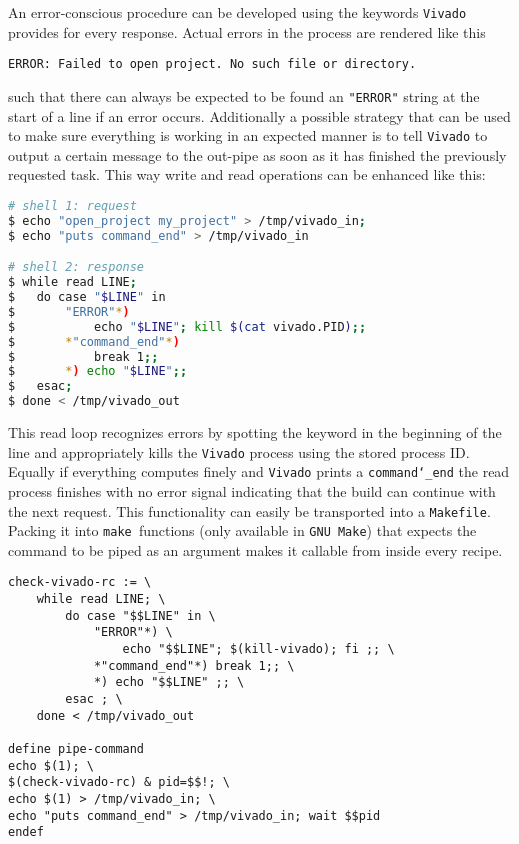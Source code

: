 An error-conscious procedure can be developed using the keywords \texttt{Vivado} provides for every response. Actual errors in the process are rendered like this
\begin{lstlisting}
ERROR: Failed to open project. No such file or directory.
\end{lstlisting}
\noindent
such that there can always be expected to be found an \texttt{"ERROR"} string at the start of a line if an error occurs. Additionally a possible strategy that can be used to make sure everything is working in an expected manner is to tell \texttt{Vivado} to output a certain message to the out-pipe as soon as it has finished the previously requested task. This way write and read operations can be enhanced like this:

\begin{lstlisting}[language=bash]
# shell 1: request
$ echo "open_project my_project" > /tmp/vivado_in;
$ echo "puts command_end" > /tmp/vivado_in

# shell 2: response
$ while read LINE;
$ 	do case "$LINE" in
$		"ERROR"*)
$			echo "$LINE"; kill $(cat vivado.PID);;
$		*"command_end"*) 
$			break 1;;
$ 		*) echo "$LINE";;
$	esac;
$ done < /tmp/vivado_out
\end{lstlisting}
\noindent
This read loop recognizes errors by spotting the keyword in the beginning of the line and appropriately kills the \texttt{Vivado} process using the stored process ID. Equally if everything computes finely and \texttt{Vivado} prints a \texttt{command\char`_end} the read process finishes with no error signal indicating that the build can continue with the next request. This functionality can easily be transported into a \texttt{Makefile}. Packing it into \texttt{make }functions (only available in \texttt{GNU Make}) that expects the command to be piped as an argument makes it callable from inside every recipe.

\begin{lstlisting}[language={[gnu] make}, caption={\texttt{Makefile} variable and function declaration},captionpos=b]
check-vivado-rc := \
	while read LINE; \
		do case "$$LINE" in \
			"ERROR"*) \
				echo "$$LINE"; $(kill-vivado); fi ;; \
			*"command_end"*) break 1;; \
			*) echo "$$LINE" ;; \
		esac ; \
	done < /tmp/vivado_out
	
define pipe-command
echo $(1); \
$(check-vivado-rc) & pid=$$!; \
echo $(1) > /tmp/vivado_in; \
echo "puts command_end" > /tmp/vivado_in; wait $$pid
endef
\end{lstlisting}

